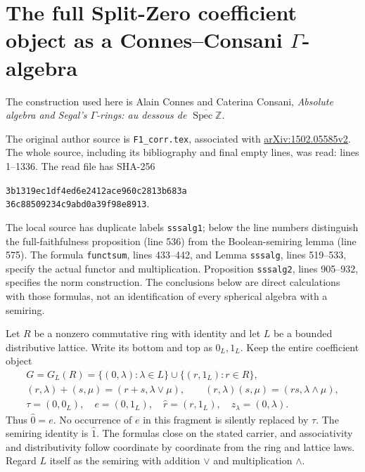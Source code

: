 \section{The full Split-Zero coefficient object as a Connes--Consani
\texorpdfstring{$\Gamma$}{Gamma}-algebra}

The construction used here is Alain Connes and Caterina Consani,
\emph{Absolute algebra and Segal's $\Gamma$-rings: au dessous de
$\overline{\operatorname{Spec}\mathbb Z}$}.

The original author source is
\nolinkurl{F1_corr.tex}, associated with
\href{https://arxiv.org/abs/1502.05585v2}{arXiv:1502.05585v2}.
The whole source, including its bibliography and final empty lines,
was read: lines 1--1336.  The read file has SHA-256
\begin{center}\small\texttt{3b1319ec1df4ed6e2412ace960c2813b683a}\\
\texttt{36c88509234c9abd0a39f98e8913}.\end{center}
The local source has duplicate labels \texttt{sssalg1}; below the
line numbers distinguish the full-faithfulness proposition (line 536)
from the Boolean-semiring lemma (line 575).  The formula
\texttt{functsum}, lines 433--442, and Lemma \texttt{sssalg},
lines 519--533, specify the actual functor and multiplication.
Proposition \texttt{sssalg2}, lines 905--932, specifies the norm
construction.  The conclusions below are direct calculations with
those formulas, not an identification of every spherical algebra with
a semiring.

Let $R$ be a nonzero commutative ring with identity and let $L$ be a
bounded distributive lattice.  Write its bottom and top as $0_L,1_L$.
Keep the entire coefficient object
\begin{equation}\tag{HG1}
 \begin{gathered}
 G=G_L(R)=\{(0,\lambda):\lambda\in L\}
       \cup\{(r,1_L):r\in R\},\\
 (r,\lambda)+(s,\mu)=(r+s,\lambda\vee\mu),\qquad
 (r,\lambda)(s,\mu)=(rs,\lambda\wedge\mu),\\
 \tau=(0,0_L),\quad e=(0,1_L),\quad
 \widehat r=(r,1_L),\quad z_\lambda=(0,\lambda).
 \end{gathered}
\end{equation}
Thus $\widehat0=e$.  No occurrence of $e$ in this fragment is
silently replaced by $\tau$.  The semiring identity is $\widehat1$.
The formulas close on the stated carrier, and associativity and
distributivity follow coordinate by coordinate from the ring and
lattice laws.  Regard $L$ itself as the semiring with addition $\vee$
and multiplication $\wedge$.

